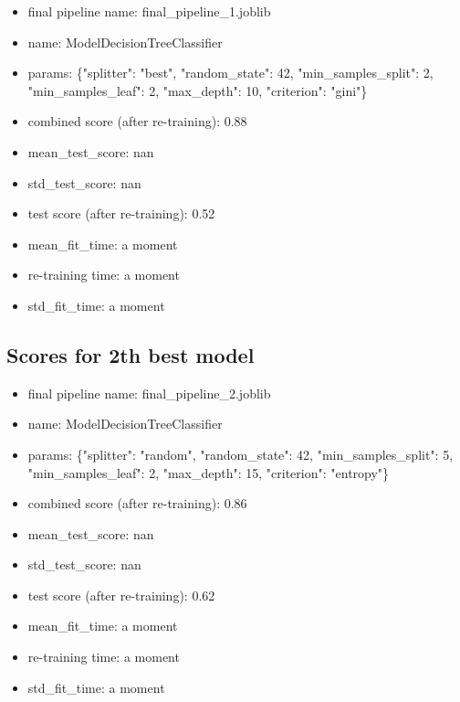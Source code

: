 \documentclass{article}%
\begin{document}
%
\begin{itemize}%
\item%
final pipeline name: final\_pipeline\_1.joblib%
\item%
name: ModelDecisionTreeClassifier%
\item%
params: \{"splitter": "best", "random\_state": 42, "min\_samples\_split": 2, "min\_samples\_leaf": 2, "max\_depth": 10, "criterion": "gini"\}%
\item%
combined score (after re{-}training): 0.88%
\item%
mean\_test\_score: nan%
\item%
std\_test\_score: nan%
\item%
test score (after re{-}training): 0.52%
\item%
mean\_fit\_time: a moment%
\item%
re{-}training time: a moment%
\item%
std\_fit\_time: a moment%
\end{itemize}%
\subsection{Scores for 2th best model}%
\label{subsec:Scoresfor2thbestmodel}%

%
\begin{itemize}%
\item%
final pipeline name: final\_pipeline\_2.joblib%
\item%
name: ModelDecisionTreeClassifier%
\item%
params: \{"splitter": "random", "random\_state": 42, "min\_samples\_split": 5, "min\_samples\_leaf": 2, "max\_depth": 15, "criterion": "entropy"\}%
\item%
combined score (after re{-}training): 0.86%
\item%
mean\_test\_score: nan%
\item%
std\_test\_score: nan%
\item%
test score (after re{-}training): 0.62%
\item%
mean\_fit\_time: a moment%
\item%
re{-}training time: a moment%
\item%
std\_fit\_time: a moment%
\end{itemize}%
\end{document}
